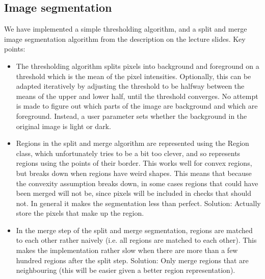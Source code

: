 \subsection{Image segmentation}
\label{sec:segmentation}
We have implemented a simple thresholding algorithm, and a split and
merge image segmentation algorithm from the description on the lecture
slides. Key points:

\begin{itemize}

\item The thresholding algorithm splits pixels into background and
  foreground on a threshold which is the mean of the pixel
  intensities. Optionally, this can be adapted iteratively by
  adjusting the threshold to be halfway between the means of the upper
  and lower half, until the threshold converges. No attempt is made to
  figure out which parts of the image are background and which are
  foreground. Instead, a user parameter sets whether the background in
  the original image is light or dark.
\item Regions in the split and merge algorithm are represented using
  the Region class, which unfortunately tries to be a bit too clever,
  and so represents regions using the points of their border. This
  works well for convex regions, but breaks down when regions have
  weird shapes. This means that because the convexity assumption
  breaks down, in some cases regions that could have been merged will
  not be, since pixels will be included in checks that should not. In
  general it makes the segmentation less than perfect. Solution:
  Actually store the pixels that make up the region.
\item In the merge step of the split and merge segmentation, regions
  are matched to each other rather naively (i.e. all regions are
  matched to each other). This makes the implementation rather slow
  when there are more than a few hundred regions after the split step.
  Solution: Only merge regions that are neighbouring (this will be
  easier given a better region representation).
\end{itemize}
